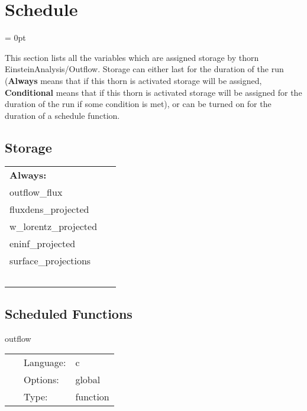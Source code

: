 
\section{Schedule} 


\parskip = 0pt


\noindent This section lists all the variables which are assigned storage by thorn EinsteinAnalysis/Outflow.  Storage can either last for the duration of the run ({\bf Always} means that if this thorn is activated storage will be assigned, {\bf Conditional} means that if this thorn is activated storage will be assigned for the duration of the run if some condition is met), or can be turned on for the duration of a schedule function.


\subsection*{Storage}

\hspace{5mm}

 \begin{tabular*}{160mm}{ll} 

{\bf Always:}&  ~ \\ 
 outflow\_flux & ~\\ 
 fluxdens\_projected & ~\\ 
 w\_lorentz\_projected & ~\\ 
 eninf\_projected & ~\\ 
 surface\_projections & ~\\ 
~ & ~\\ 
\end{tabular*} 


\subsection*{Scheduled Functions}
\vspace{5mm}


\hspace{5mm} outflow 

\hspace{5mm}{\it compute outflow } 


\hspace{5mm}

 \begin{tabular*}{160mm}{cll} 
~ & Language:  & c \\ 
~ & Options:  & global \\ 
~ & Type:  & function \\ 
\end{tabular*} 



